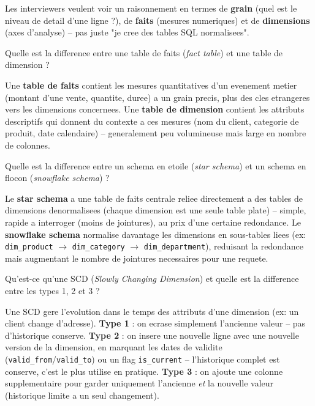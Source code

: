 \documentclass[11pt,a4paper]{article}
\begin{document}
\begin{cle}
Les interviewers veulent voir un raisonnement en termes de \textbf{grain} (quel est le niveau de detail d'une ligne ?), de \textbf{faits} (mesures numeriques) et de \textbf{dimensions} (axes d'analyse) -- pas juste "je cree des tables SQL normalisees".
\end{cle}

\begin{question} Quelle est la difference entre une table de faits (\emph{fact table}) et une table de dimension ?
\end{question}
\begin{reponse}
Une \textbf{table de faits} contient les mesures quantitatives d'un evenement metier (montant d'une vente, quantite, duree) a un grain precis, plus des cles etrangeres vers les dimensions concernees. Une \textbf{table de dimension} contient les attributs descriptifs qui donnent du contexte a ces mesures (nom du client, categorie de produit, date calendaire) -- generalement peu volumineuse mais large en nombre de colonnes.
\end{reponse}

\begin{question} Quelle est la difference entre un schema en etoile (\emph{star schema}) et un schema en flocon (\emph{snowflake schema}) ?
\end{question}
\begin{reponse}
Le \textbf{star schema} a une table de faits centrale reliee directement a des tables de dimensions denormalisees (chaque dimension est une seule table plate) -- simple, rapide a interroger (moins de jointures), au prix d'une certaine redondance. Le \textbf{snowflake schema} normalise davantage les dimensions en sous-tables liees (ex: \texttt{dim\_product} $\to$ \texttt{dim\_category} $\to$ \texttt{dim\_department}), reduisant la redondance mais augmentant le nombre de jointures necessaires pour une requete.
\end{reponse}

\begin{question} Qu'est-ce qu'une SCD (\emph{Slowly Changing Dimension}) et quelle est la difference entre les types 1, 2 et 3 ?
\end{question}
\begin{reponse}
Une SCD gere l'evolution dans le temps des attributs d'une dimension (ex: un client change d'adresse). \textbf{Type 1} : on ecrase simplement l'ancienne valeur -- pas d'historique conserve. \textbf{Type 2} : on insere une nouvelle ligne avec une nouvelle version de la dimension, en marquant les dates de validite (\texttt{valid\_from}/\texttt{valid\_to}) ou un flag \texttt{is\_current} -- l'historique complet est conserve, c'est le plus utilise en pratique. \textbf{Type 3} : on ajoute une colonne supplementaire pour garder uniquement l'ancienne \emph{et} la nouvelle valeur (historique limite a un seul changement).
\end{reponse}
\end{document}
